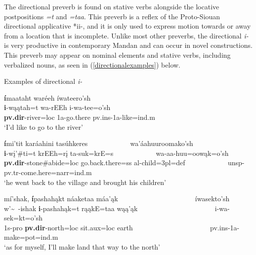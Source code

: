 \label{SubParaDirectional}

The directional preverb is found on stative verbs alongside the locative postpositions \textit{=t} and \textit{=taa}. This preverb is a reflex of the Proto-Siouan directional applicative *ii-, and it is only used to express motion towards or away from a location that is incomplete. Unlike most other preverbs, the directional \textit{i-} is very productive in contemporary Mandan and can occur in novel constructions. This preverb may appear on nominal elements and stative verbs, including verbalized nouns, as seen in (\ref{directionalexamples}) below. 

\begin{exe}
\item\label{directionalexamples} Examples of directional \textit{i-}

\begin{xlist}

\item \glll \textbf{í}maataht waréeh íwateero'sh\\
	\textbf{i}-wąątah=t wa-rEEh i-wa-tee=o'sh\\
	\textbf{pv.dir}-\textnormal{river}=loc 1a-\textnormal{go.there} pv.ins-1a-\textnormal{like}=ind.m\\
	\glt `I'd like to go to the river' \citep[35]{hollow1973a}

\item \glll \textbf{í}mi'tit karáahini tasúhkeres ~ ~ ~ ~ ~ ~ ~ wa'áahuuroomako'sh\\
	\textbf{i}-wį'\#ti=t krEEh=rį ta-suk=krE=s ~ ~  ~ ~ ~ ~ ~ wa-aa-huu=oowąk=o'sh\\
	\textbf{pv.dir}-\textnormal{stone}\#\textnormal{abide}=loc \textnormal{go.back.there}=ss al-\textnormal{child}=3pl=def ~ ~ ~ ~ ~ ~ ~ unsp-pv.tr-\textnormal{come.here}=narr=ind.m\\
	\glt `he went back to the village and brought his children' \citep[177]{hollow1973a}
	
\item \glll mí'shak, \textbf{í}pashahąkt náaketaa máa'ąk ~ ~ ~ ~ ~ ~ ~ ~ ~ ~ ~ ~ ~ íwasekto'sh\\
	w'\~~-ishak \textbf{i}-pashahąk=t rąąkE=taa wąą'ąk ~ ~ ~ ~ ~ ~ ~ ~ ~ ~ ~ ~ ~ i-wa-sek=kt=o'sh\\
	1s-pro \textbf{pv.dir}-\textnormal{north}=loc \textnormal{sit}.aux=loc \textnormal{earth} ~ ~ ~ ~ ~ ~ ~ ~ ~ ~ ~ ~ ~ pv.ins-1a-\textnormal{make}=pot=ind.m\\
	\glt `as for myself, I'll make land that way to the north' \citep[9]{hollow1973a}


\end{xlist}
\end{exe}
